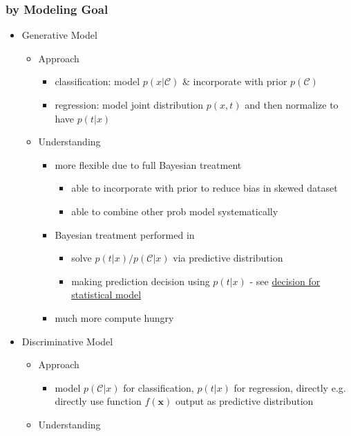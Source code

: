 \subsubsection{by Modeling Goal}
\begin{itemize}
\item Generative Model
	\begin{itemize}
	\item Approach
		\begin{itemize}
		\item classification: model $p(x|\mathcal C)$ \& incorporate with prior $p(\mathcal C)$
		\item regression: model joint distribution $p(x, t)$ and then normalize to have $p(t|x)$
		\end{itemize}
	\item Understanding
		\begin{itemize}
		\item more flexible due to full Bayesian treatment
			\begin{itemize}
			\item able to incorporate with prior to reduce bias in skewed dataset
			\item able to combine other prob model systematically
			\end{itemize}
		\item Bayesian treatment performed in
			\begin{itemize}
			\item solve $p(t|x) / p(\mathcal C|x)$ via predictive distribution
			\item making prediction decision using $p(t|x)$ - see \hyperref[Intro_Decision_Stat]{decision for statistical model}
			\end{itemize} 
		\item much more compute hungry
		\end{itemize}
	\end{itemize}
\item Discriminative Model
	\begin{itemize}
	\item Approach
		\begin{itemize}
		\item model $p(\mathcal C|x)$ for classification, $p(t|x)$ for regression, directly
		e.g. directly use function $f(\mathbf x)$ output as predictive distribution
		\end{itemize}
	\item Understanding
		\begin{itemize}

\end{itemize}
\end{itemize}
\end{itemize}
